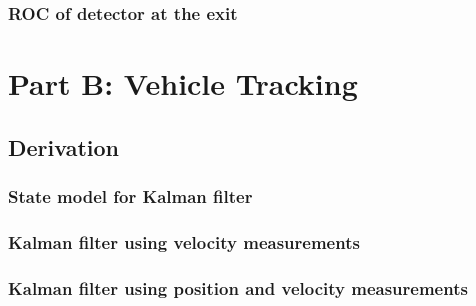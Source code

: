 \documentclass[11pt]{article}
\begin{document}

\subsubsection{ROC of detector at the exit}
\label{subsubsec:exitDetector_roc}



\section{Part B: Vehicle Tracking}
\label{sec:partA_Tracking}


\subsection{Derivation}
\label{subsec:partB_derivation}


\subsubsection{State model for Kalman filter}
\label{subsubsec:stateModel}


\subsubsection{Kalman filter using velocity measurements}
\label{subsubsec:velocityKalmanFilter}


\subsubsection{Kalman filter using position and velocity measurements}
\label{subsubsec:fullKalmanFilter}
\end{document}
